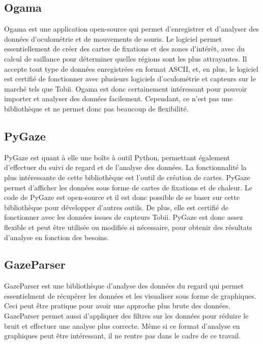 \documentclass[hidelinks,12pt]{article}
\begin{document}
\subsection{Ogama}

Ogama \cite{ogama} est une application open-source qui permet d'enregistrer et
d'analyser des données d'oculométrie et de mouvements de souris. Le logiciel
permet essentiellement de créer des cartes de fixations et des zones d'intérêt,
avec du calcul de saillance pour déterminer quelles régions sont les plus
attrayantes. Il accepte tout type de données enregistrées en format ASCII, et,
en plus, le logiciel est certifié de fonctionner avec plusieurs logiciels
d'oculométrie et capteurs sur le marché tels que Tobii. Ogama est donc
certainement intéressant pour pouvoir importer et analyser des données
facilement. Cependant, ce n'est pas une bibliothèque et ne permet donc pas
beaucoup de flexibilité.

\subsection{PyGaze}

PyGaze \cite{pygaze} est quant à elle une boîte à outil Python, permettant
également d'effectuer du suivi de regard et de l'analyse des données. La
fonctionnalité la plus intéressante de cette bibliothèque est l'outil
de création de cartes. PyGaze permet d'afficher les données sous forme de
cartes de fixations et de chaleur. Le code de PyGaze est open-source et il est
donc possible de se baser sur cette bibliothèque pour développer d'autres
outils. De plus, elle est certifié de fonctionner avec les données issues de
capteurs Tobii. PyGaze est donc assez flexible et peut être utilisée ou
modifiée si nécessaire, pour obtenir des résultats d'analyse en fonction des
besoins.

\subsection{GazeParser}

GazeParser \cite{gazeparser} est une bibliothèque d'analyse des données du
regard qui permet essentielment de récupérer les données et les visualiser sous
forme de graphiques. Ceci peut être pratique pour avoir une approche plus brute
des données. GazeParser permet aussi d'appliquer des filtres sur les données
pour réduire le bruit et effectuer une analyse plus correcte. Même si ce format
d'analyse en graphiques peut être intéressant, il ne rentre pas dans le cadre
de ce travail.
\end{document}
